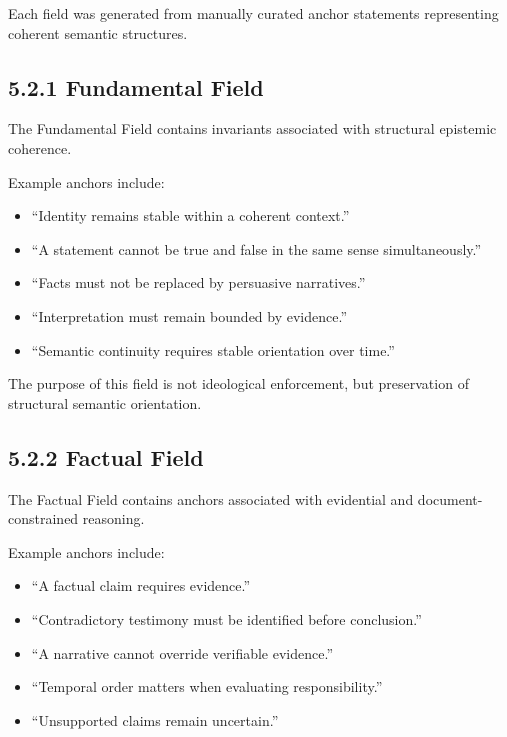\documentclass[11pt]{article}
\begin{document}
Each field was generated from manually curated anchor statements representing coherent semantic structures.

\subsection{5.2.1 Fundamental Field}

The Fundamental Field contains invariants associated with structural epistemic coherence.

Example anchors include:

\begin{itemize}
\item ``Identity remains stable within a coherent context.''
\end{itemize}
\begin{itemize}
\item ``A statement cannot be true and false in the same sense simultaneously.''
\end{itemize}
\begin{itemize}
\item ``Facts must not be replaced by persuasive narratives.''
\end{itemize}
\begin{itemize}
\item ``Interpretation must remain bounded by evidence.''
\end{itemize}
\begin{itemize}
\item ``Semantic continuity requires stable orientation over time.''
\end{itemize}

The purpose of this field is not ideological enforcement, but preservation of structural semantic orientation.

\subsection{5.2.2 Factual Field}

The Factual Field contains anchors associated with evidential and document-constrained reasoning.

Example anchors include:

\begin{itemize}
\item ``A factual claim requires evidence.''
\end{itemize}
\begin{itemize}
\item ``Contradictory testimony must be identified before conclusion.''
\end{itemize}
\begin{itemize}
\item ``A narrative cannot override verifiable evidence.''
\end{itemize}
\begin{itemize}
\item ``Temporal order matters when evaluating responsibility.''
\end{itemize}
\begin{itemize}
\item ``Unsupported claims remain uncertain.''
\end{itemize}
\end{document}
